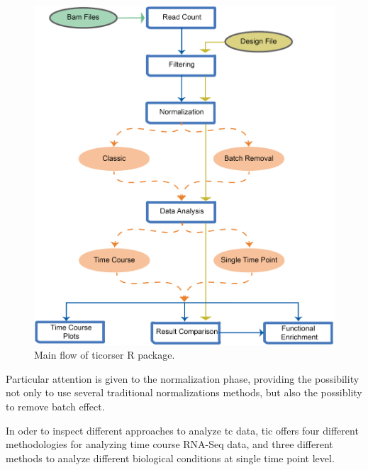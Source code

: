 \begin{figure}[H]
\includegraphics[width=\textwidth,height=\textheight,keepaspectratio]{img/ticorser/main_flow.pdf}
\caption[ticorser mainflow]{Main flow of ticorser R package.}
\label{fig:ticorserflow}
\centering
\end{figure}
 
Particular attention is given to the normalization phase, providing the possibility not only to use several traditional normalizations methods, but also the possiblity to remove batch effect.

In oder to inspect different approaches to analyze \gls{tc} data, \gls{tic} offers four different methodologies for analyzing time course RNA-Seq data, and three different methods to analyze different biological conditions at single time point level.

